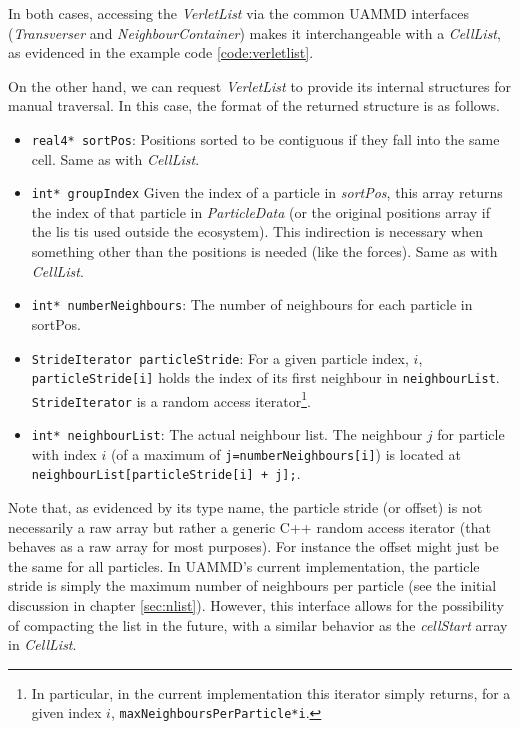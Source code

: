 \documentclass[ twoside,openright,titlepage,numbers=noenddot,%
headinclude,footinclude,cleardoublepage=empty,abstract=on,
BCOR=5mm,paper=a4,fontsize=11pt, dvipsnames
]{scrreprt}
\def\ucpp{uammd_cpp_lexer.py:UAMMDCppLexer -x}
\newcommand{\uammd}{\gls{UAMMD}\xspace}
\begin{document}
In both cases, accessing the \emph{VerletList} via the common \uammd interfaces (\emph{Transverser} and \emph{NeighbourContainer}) makes it interchangeable with a \emph{CellList}, as evidenced in the example code \ref{code:verletlist}.

On the other hand, we can request \emph{VerletList} to provide its internal structures for manual traversal. In this case, the format of the returned structure is as follows.
\begin{itemize}
\item\texttt{real4* sortPos}:
  Positions sorted to be contiguous if they fall into the same cell. Same as with \emph{CellList}.
\item\texttt{int* groupIndex}
  Given the index of a particle in \emph{sortPos}, this array returns the index of that particle in \emph{ParticleData} (or the original positions array if the lis tis used outside the ecosystem).
  This indirection is necessary when something other than the positions is needed (like the forces). Same as with \emph{CellList}.
\item\texttt{int* numberNeighbours}:
  The number of neighbours for each particle in sortPos.
\item\texttt{StrideIterator particleStride}:
  For a given particle index, $i$, \texttt{particleStride[i]} holds the index of its first neighbour in \texttt{neighbourList}. \texttt{StrideIterator} is a random access iterator\footnote{In particular, in the current implementation this iterator simply returns, for a given index $i$, \texttt{maxNeighboursPerParticle*i}.}.
\item\texttt{int* neighbourList}:
  The actual neighbour list. The neighbour $j$ for particle with index $i$ (of a maximum of \texttt{j=numberNeighbours[i]}) is located at \texttt{neighbourList[particleStride[i] + j];}.
\end{itemize}

Note that, as evidenced by its type name, the particle stride (or offset) is not necessarily a raw array but rather a generic C++ random access iterator (that behaves as a raw array for most purposes). For instance the offset might just be the same for all particles. In \uammd's current implementation, the particle stride is simply the maximum number of neighbours per particle (see the initial discussion in chapter \ref{sec:nlist}). However, this interface allows for the possibility of compacting the list in the future, with a similar behavior as the \emph{cellStart} array in \emph{CellList}.
\end{document}
